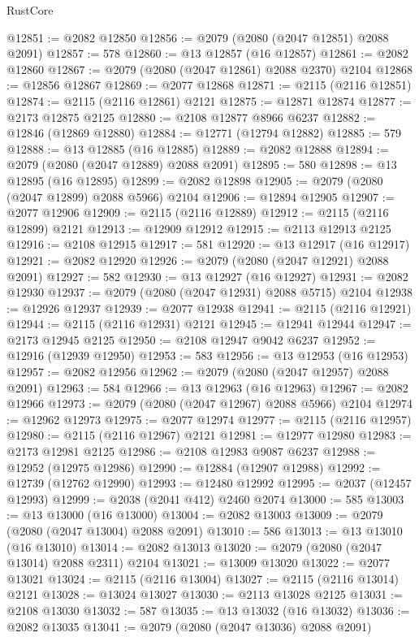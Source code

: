 \begin{lexlean}{RustCore}
\begin{coremodule}
@12851 := @2082 @12850
@12856 := @2079 (@2080 (@2047 @12851) @2088 @2091)
@12857 := 578
@12860 := @13 @12857 (@16 @12857)
@12861 := @2082 @12860
@12867 := @2079 (@2080 (@2047 @12861) @2088 @2370) @2104
@12868 := @12856 @12867
@12869 := @2077 @12868
@12871 := @2115 (@2116 @12851)
@12874 := @2115 (@2116 @12861) @2121
@12875 := @12871 @12874
@12877 := @2173 @12875 @2125
@12880 := @2108 @12877 @8966 @6237
@12882 := @12846 (@12869 @12880)
@12884 := @12771 (@12794 @12882)
@12885 := 579
@12888 := @13 @12885 (@16 @12885)
@12889 := @2082 @12888
@12894 := @2079 (@2080 (@2047 @12889) @2088 @2091)
@12895 := 580
@12898 := @13 @12895 (@16 @12895)
@12899 := @2082 @12898
@12905 := @2079 (@2080 (@2047 @12899) @2088 @5966) @2104
@12906 := @12894 @12905
@12907 := @2077 @12906
@12909 := @2115 (@2116 @12889)
@12912 := @2115 (@2116 @12899) @2121
@12913 := @12909 @12912
@12915 := @2113 @12913 @2125
@12916 := @2108 @12915
@12917 := 581
@12920 := @13 @12917 (@16 @12917)
@12921 := @2082 @12920
@12926 := @2079 (@2080 (@2047 @12921) @2088 @2091)
@12927 := 582
@12930 := @13 @12927 (@16 @12927)
@12931 := @2082 @12930
@12937 := @2079 (@2080 (@2047 @12931) @2088 @5715) @2104
@12938 := @12926 @12937
@12939 := @2077 @12938
@12941 := @2115 (@2116 @12921)
@12944 := @2115 (@2116 @12931) @2121
@12945 := @12941 @12944
@12947 := @2173 @12945 @2125
@12950 := @2108 @12947 @9042 @6237
@12952 := @12916 (@12939 @12950)
@12953 := 583
@12956 := @13 @12953 (@16 @12953)
@12957 := @2082 @12956
@12962 := @2079 (@2080 (@2047 @12957) @2088 @2091)
@12963 := 584
@12966 := @13 @12963 (@16 @12963)
@12967 := @2082 @12966
@12973 := @2079 (@2080 (@2047 @12967) @2088 @5966) @2104
@12974 := @12962 @12973
@12975 := @2077 @12974
@12977 := @2115 (@2116 @12957)
@12980 := @2115 (@2116 @12967) @2121
@12981 := @12977 @12980
@12983 := @2173 @12981 @2125
@12986 := @2108 @12983 @9087 @6237
@12988 := @12952 (@12975 @12986)
@12990 := @12884 (@12907 @12988)
@12992 := @12739 (@12762 @12990)
@12993 := @12480 @12992
@12995 := @2037 (@12457 @12993)
@12999 := @2038 (@2041 @412) @2460 @2074
@13000 := 585
@13003 := @13 @13000 (@16 @13000)
@13004 := @2082 @13003
@13009 := @2079 (@2080 (@2047 @13004) @2088 @2091)
@13010 := 586
@13013 := @13 @13010 (@16 @13010)
@13014 := @2082 @13013
@13020 := @2079 (@2080 (@2047 @13014) @2088 @2311) @2104
@13021 := @13009 @13020
@13022 := @2077 @13021
@13024 := @2115 (@2116 @13004)
@13027 := @2115 (@2116 @13014) @2121
@13028 := @13024 @13027
@13030 := @2113 @13028 @2125
@13031 := @2108 @13030
@13032 := 587
@13035 := @13 @13032 (@16 @13032)
@13036 := @2082 @13035
@13041 := @2079 (@2080 (@2047 @13036) @2088 @2091)

\end{coremodule}
\end{lexlean}
